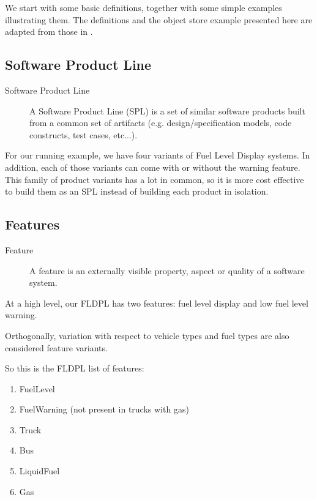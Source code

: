\documentclass[11pt]{article}
\begin{document}
We start with some basic definitions, together with some simple examples illustrating them. The definitions and the object store example presented here are adapted from those in \cite{Thum}.

\subsection{Software Product Line}

\begin{description}

\item[Software Product Line]
A Software Product Line (SPL) is a set of similar software products built from a common set of artifacts (e.g. design/specification models, code constructs, test cases, etc...).

\end{description}

For our running example, we have four variants of Fuel Level Display systems. In addition, each of those variants can come with or without the warning feature. This family of product variants has a lot in common, so it is more cost effective to build them as an SPL instead of building each product in isolation.

\subsection{Features}

\begin{description}

\item[Feature]
A feature is an externally visible property, aspect or quality of a software system.

\end{description}

At a high level, our FLDPL has two features: fuel level display and low fuel level warning.

Orthogonally, variation with respect to vehicle types and fuel types are also considered feature variants. 

So this is the FLDPL list of features:

\begin{enumerate}
\item FuelLevel
\item FuelWarning (not present in trucks with gas)
\item Truck
\item Bus
\item LiquidFuel
\item Gas
\end{enumerate}
\end{document}

